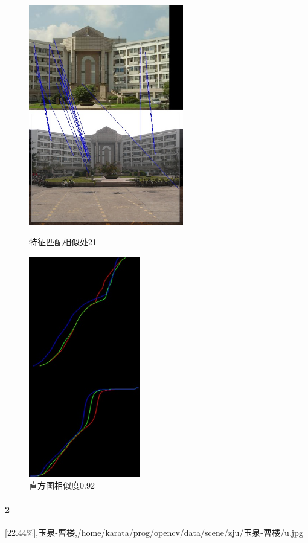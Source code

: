 \begin{figure}[htb]
\begin{minipage}[t]{0.5\linewidth}
\centering
\includegraphics[height=3.8in]{玉泉曹楼.jpg.d/im1sift.jpg}
\caption{特征匹配相似处21}
\label{fig:side:a}
\end{minipage}%
\begin{minipage}[t]{0.5\linewidth}
\centering
\includegraphics[height=3.8in]{玉泉曹楼.jpg.d/im1hist2.jpg}
\caption{直方图相似度0.92}
\label{fig:side:a}
\end{minipage}%
\end{figure}

\clearpage
\paragraph{2}
[22.44\%],玉泉-曹楼,/home/karata/prog/opencv/data/scene/zju/玉泉-曹楼/u.jpg

